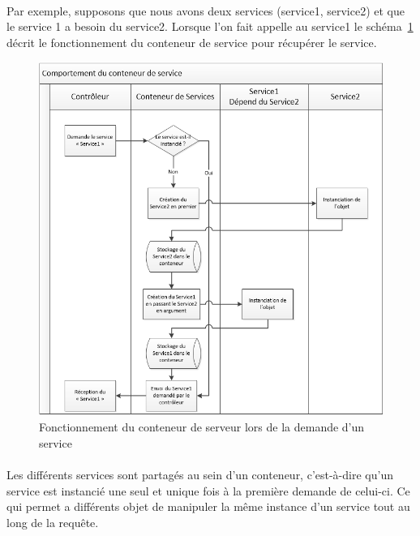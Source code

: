 \paragraph{}
Par exemple, supposons que nous avons deux services (service1, service2) et que le service 1 a besoin du service2. Lorsque l'on fait appelle au service1 le schéma~\ref{conteneur} décrit le fonctionnement du conteneur de service pour récupérer le service.
		\begin{figure}[H]
        \begin{center}
          \includegraphics[scale=0.8]{images/conteneur_service}
        \end{center}
        \caption{Fonctionnement du conteneur de serveur lors de la demande d'un service}
        \label{conteneur}
      \end{figure}

\paragraph{}
Les différents services sont partagés au sein d'un conteneur, c'est-à-dire qu'un service est instancié une seul et unique fois à la première demande de celui-ci. Ce qui permet a  différents objet de manipuler la même instance d'un service tout au long de la requête.
